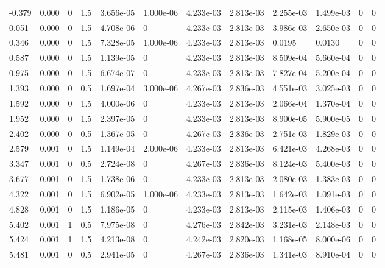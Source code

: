\documentclass[preview]{standalone}
\begin{document}
{{\begin{tabular}{L{1.2cm}C{1.2cm} C{0.3cm}C{0.5cm} C{1.4cm}C{1.4cm} C{1.4cm}C{1.4cm} C{1.6cm}C{1.6cm} C{1.6cm}C{1.6cm}}
  -0.379  &  0.000  & 0     & 1.5 &  3.656e-05  & 1.000e-06  &  4.233e-03&   2.813e-03& 2.255e-03 & 1.499e-03   &  0 & 0  \\ 
  0.051  &  0.000  & 0     & 1.5 &  4.708e-06  & 0  &  4.233e-03&   2.813e-03& 3.986e-03 & 2.650e-03   &  0 & 0  \\ 
  0.346  &  0.000  & 0     & 1.5 &  7.328e-05  & 1.000e-06  &  4.233e-03&   2.813e-03& 0.0195 & 0.0130   &  0 & 0  \\ 
  0.587  &  0.000  & 0     & 1.5 &  1.139e-05  & 0  &  4.233e-03&   2.813e-03& 8.509e-04 & 5.660e-04   &  0 & 0  \\ 
  0.975  &  0.000  & 0     & 1.5 &  6.674e-07  & 0  &  4.233e-03&   2.813e-03& 7.827e-04 & 5.200e-04   &  0 & 0  \\ 
  1.393  &  0.000  & 0     & 0.5 &  1.697e-04  & 3.000e-06  &  4.267e-03&   2.836e-03& 4.551e-03 & 3.025e-03   &  0 & 0  \\ 
  1.592  &  0.000  & 0     & 1.5 &  4.000e-06  & 0  &  4.233e-03&   2.813e-03& 2.066e-04 & 1.370e-04   &  0 & 0  \\ 
  1.952  &  0.000  & 0     & 1.5 &  2.397e-05  & 0  &  4.233e-03&   2.813e-03& 8.900e-05 & 5.900e-05   &  0 & 0  \\ 
  2.402  &  0.000  & 0     & 0.5 &  1.367e-05  & 0  &  4.267e-03&   2.836e-03& 2.751e-03 & 1.829e-03   &  0 & 0  \\ 
  2.579  &  0.001  & 0     & 1.5 &  1.149e-04  & 2.000e-06  &  4.233e-03&   2.813e-03& 6.421e-03 & 4.268e-03   &  0 & 0  \\ 
  3.347  &  0.001  & 0     & 0.5 &  2.724e-08  & 0  &  4.267e-03&   2.836e-03& 8.124e-03 & 5.400e-03   &  0 & 0  \\ 
  3.677  &  0.001  & 0     & 1.5 &  1.738e-06  & 0  &  4.233e-03&   2.813e-03& 2.080e-03 & 1.383e-03   &  0 & 0  \\ 
  4.322  &  0.001  & 0     & 1.5 &  6.902e-05  & 1.000e-06  &  4.233e-03&   2.813e-03& 1.642e-03 & 1.091e-03   &  0 & 0  \\ 
  4.828  &  0.001  & 0     & 1.5 &  1.186e-05  & 0  &  4.233e-03&   2.813e-03& 2.115e-03 & 1.406e-03   &  0 & 0  \\ 
  5.402  &  0.001  & 1     & 0.5 &  7.975e-08  & 0  &  4.276e-03&   2.842e-03& 3.231e-03 & 2.148e-03   &  0 & 0  \\ 
  5.424  &  0.001  & 1     & 1.5 &  4.213e-08  & 0  &  4.242e-03&   2.820e-03& 1.168e-05 & 8.000e-06   &  0 & 0  \\ 
  5.481  &  0.001  & 0     & 0.5 &  2.941e-05  & 0  &  4.267e-03&   2.836e-03& 1.341e-03 & 8.910e-04   &  0 & 0  \\ 

\end{tabular}}}
\end{document}
